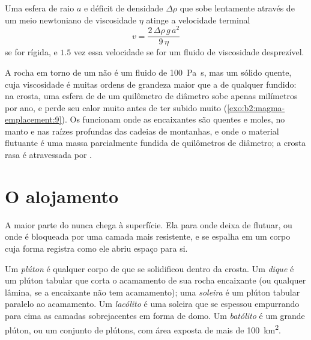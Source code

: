 \begin{proposition}\label{prop:b2:magma-emplacement:stokes}
Uma esfera de raio $a$ e déficit de densidade $\Delta\rho$ que sobe lentamente através de um
meio newtoniano de viscosidade $\eta$ atinge a velocidade terminal
\[
v = \frac{2\,\Delta\rho\,g\,a^2}{9\,\eta}
\]
se for rígida, e $1.5$ vez essa velocidade se for um fluido de viscosidade desprezível.
\end{proposition}
\admitted

A rocha em torno de um  não é um fluido de \qty{100}{Pa.s}, mas um sólido quente,
cuja viscosidade é muitas ordens de grandeza maior que a de qualquer fundido: na
crosta, uma esfera de  de um quilômetro de diâmetro sobe apenas milímetros por ano, e
perde seu calor muito antes de ter subido muito (\cref{exo:b2:magma-emplacement:9}). Os 
funcionam onde as encaixantes são quentes e moles, no manto e nas raízes profundas
das cadeias de montanhas, e onde o material flutuante é uma massa parcialmente fundida
de quilômetros de diâmetro; a crosta rasa é atravessada por .

\section{O alojamento}

A maior parte do  nunca chega à superfície. Ela para onde deixa de flutuar,
ou onde é bloqueada por uma camada mais resistente, e se espalha em um corpo cuja forma
registra como ele abriu espaço para si.

\begin{definition}\label{def:b2:magma-emplacement:bodies}
Um \emph{plúton} é qualquer corpo de  que se solidificou dentro da
crosta. Um \emph{dique} é um plúton tabular que corta o
acamamento de sua rocha encaixante (ou qualquer lâmina, se a encaixante não tem acamamento); uma
\emph{soleira} é um plúton tabular paralelo ao acamamento. Um
\emph{lacólito} é uma soleira que se espessou empurrando para cima as
camadas sobrejacentes em forma de domo. Um \emph{batólito} é um grande plúton,
ou um conjunto de plútons, com área exposta de mais de \qty{100}{km^2}.
\end{definition}


